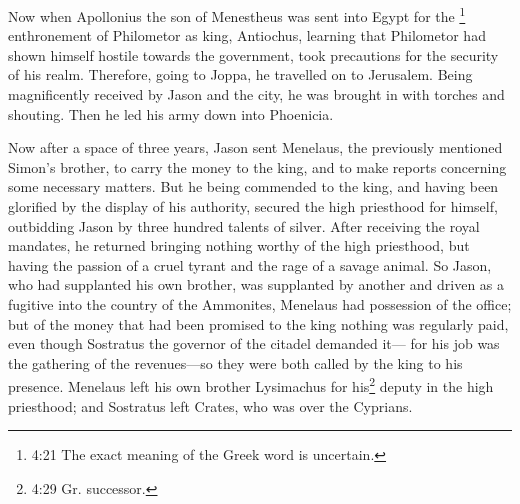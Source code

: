 Now when Apollonius the son of Menestheus was sent into
Egypt for the \footnote{4:21 The exact meaning of the Greek word is
  uncertain.} enthronement of Philometor as king, Antiochus, learning
that Philometor had shown himself hostile towards the government, took
precautions for the security of his realm. Therefore, going to Joppa, he
travelled on to Jerusalem.  Being magnificently received by
Jason and the city, he was brought in with torches and shouting. Then he
led his army down into Phoenicia.

 Now after a space of three years, Jason sent Menelaus, the
previously mentioned Simon's brother, to carry the money to the king,
and to make reports concerning some necessary matters.  But
he being commended to the king, and having been glorified by the display
of his authority, secured the high priesthood for himself, outbidding
Jason by three hundred talents of silver.  After receiving
the royal mandates, he returned bringing nothing worthy of the high
priesthood, but having the passion of a cruel tyrant and the rage of a
savage animal.  So Jason, who had supplanted his own
brother, was supplanted by another and driven as a fugitive into the
country of the Ammonites,  Menelaus had possession of the
office; but of the money that had been promised to the king nothing was
regularly paid, even though Sostratus the governor of the citadel
demanded it---  for his job was the gathering of the
revenues---so they were both called by the king to his presence.
 Menelaus left his own brother Lysimachus for
his\footnote{4:29 Gr. successor.} deputy in the high priesthood; and
Sostratus left Crates, who was over the Cyprians.

